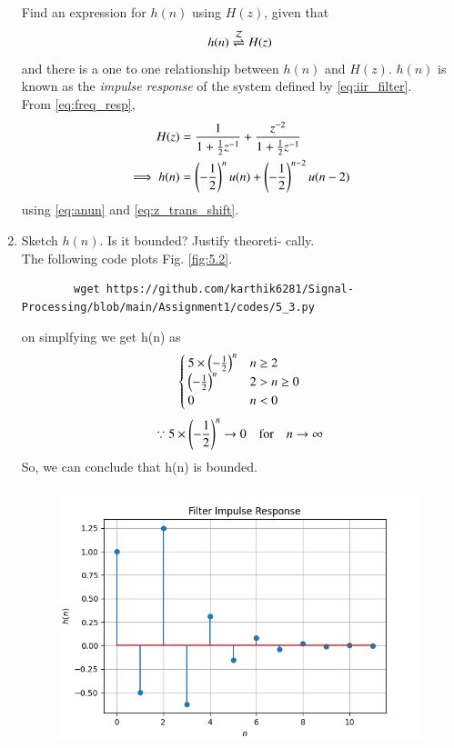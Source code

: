 \documentclass[journal,12pt,twocolumn]{IEEEtran}
\renewcommand\thesection{\arabic{section}}
\begin{document}
\begin{enumerate}[label=\thesection.\arabic*]
	Find an expression for $h(n)$ using $H(z)$, given that 
	\begin{equation}
		\label{eq:impulse_resp}
		h(n) \overset{\mathcal{Z}}{ \rightleftharpoons} H(z)
	\end{equation}
	and there is a one to one relationship between $h(n)$ and $H(z)$. $h(n)$ is known as the {\em impulse response} of the
	system defined by \eqref{eq:iir_filter}.
	\\
	\solution From \eqref{eq:freq_resp},
	\begin{align}
		H(z) &= \frac{1}{1 + \frac{1}{2}z^{-1}} + \frac{ z^{-2}}{1 + \frac{1}{2}z^{-1}}
		\\
		\implies h(n) &= \left(-\frac{1}{2}\right)^{n}u(n) + \left(-\frac{1}{2}\right)^{n-2}u(n-2)
	\end{align}
	using \eqref{eq:anun} and \eqref{eq:z_trans_shift}.
	\item Sketch $h(n)$. Is it bounded? Justify theoreti-
	cally.
	\\
	\solution The following code plots Fig. \ref{fig:5.2}.
	\begin{lstlisting}
		wget https://github.com/karthik6281/Signal-Processing/blob/main/Assignment1/codes/5_3.py
	\end{lstlisting}
	on simplfying we get h(n) as
	\begin{align}
		\begin{cases}
			5\times \left(-\frac{1}{2}\right)^n  & n\geq 2\\
			\left(-\frac{1}{2}\right)^n  &2>n\geq0\\
			0 &n<0
		\end{cases}
	\end{align}
	\begin{align}
		\because 5\times \left(-\frac{1}{2}\right)^n \to 0 \quad	\text{for} \quad n\to \infty 
	\end{align}
	So, we can conclude that h(n) is bounded.
	\begin{figure}[!ht]
		\centering
		\includegraphics[width=\columnwidth]{./figs/5_3.png}

\end{figure}
\end{enumerate}
\end{document}
